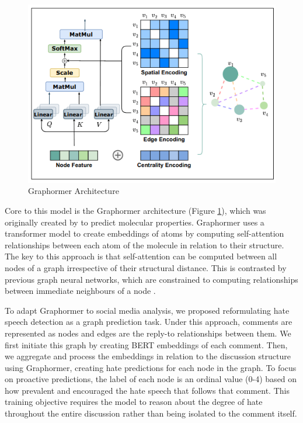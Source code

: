 \documentclass[letterpaper]{article} %
\begin{document}
\begin{figure}
    \centering
    \includegraphics[width=\linewidth]{graphormer.png}
    \caption{Graphormer Architecture}
    \label{fig:graphormer}
\end{figure}
Core to this model is the Graphormer architecture (Figure \ref{fig:graphormer}), which was originally created by \citet{ying2021transformers} to predict molecular properties. Graphormer uses a transformer model to create embeddings of atoms by computing self-attention relationships between each atom of the molecule in relation to their structure. The key to this approach is that self-attention can be computed between all nodes of a graph irrespective of their structural distance. This is contrasted by previous graph neural networks, which are constrained to computing relationships between immediate neighbours of a node \cite{wu2020comprehensive}.

To adapt Graphormer to social media analysis, we proposed reformulating hate speech detection as a graph prediction task. Under this approach, comments are represented as nodes and edges are the reply-to relationships between them. We first initiate this graph by creating BERT embeddings of each comment. Then, we aggregate and process the embeddings in relation to the discussion structure using Graphormer, creating hate predictions for each node in the graph. To focus on proactive predictions, the label of each node is an ordinal value (0-4) based on how prevalent and encouraged the hate speech that follows that comment. This training objective requires the model to reason about the degree of hate throughout the entire discussion rather than being isolated to the comment itself.
\end{document}
